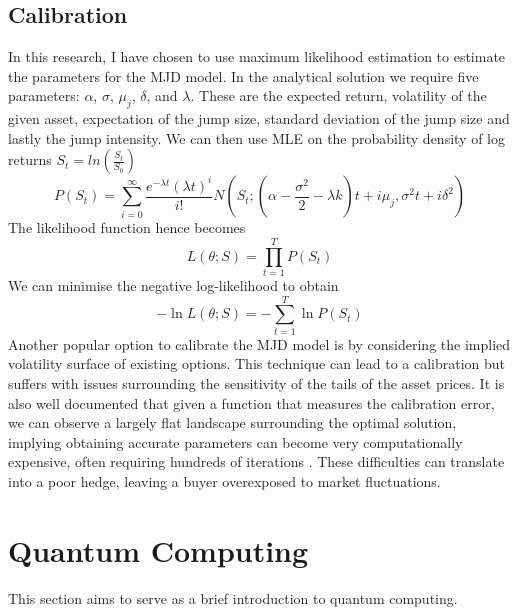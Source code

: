 \documentclass[12pt]{article}
\numberwithin{equation}{section}
\begin{document}
\subsection{Calibration}
In this research, I have chosen to use maximum likelihood estimation to estimate 
the parameters for the MJD model. In the analytical solution we require five 
parameters: $\alpha$, $\sigma$, $\mu_j$, $\delta$, and $\lambda$. These are the 
expected return, volatility of the given asset, expectation of the jump size, 
standard deviation of the jump size and lastly the jump intensity. We can then 
use MLE on the probability density of log returns $S_t = ln(\frac{S_t}{S_0})$ 
\begin{equation}
P(S_t) = \sum^\infty_{i=0} \frac{e^{-\lambda t}(\lambda t)^i}{i!}N(S_t;(\alpha - 
\frac{\sigma^2}{2}-\lambda k)t+i\mu_j,\sigma^2t+i\delta^2)
\end{equation}
The likelihood function hence becomes 
\begin{equation}
  L(\theta;S) = \prod^T_{t=1}P(S_t)
\end{equation}
We can minimise the negative log-likelihood to obtain 
\begin{equation}
  -\ln L(\theta;S) = -\sum^T_{t=1}\ln P(S_t)
\end{equation}
Another popular option to calibrate the MJD model is by considering the implied 
volatility surface of existing options. This technique can lead to a 
calibration but suffers with issues surrounding the sensitivity of the tails of 
the asset prices. It is also well documented that given a function that measures 
the calibration error, we can observe a largely flat landscape surrounding the 
optimal solution, 
implying obtaining accurate parameters can become very computationally 
expensive, often requiring hundreds of iterations \autocite{jump05}. These difficulties
can translate into a poor hedge, leaving a buyer overexposed to market fluctuations. 

\clearpage


\section{Quantum Computing}
This section aims to serve as a brief introduction to quantum computing. 
\end{document}
